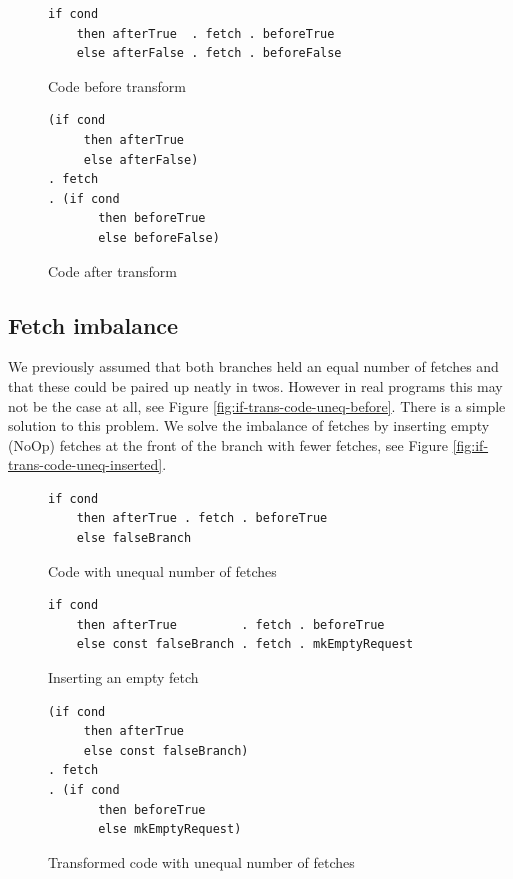 \begin{figure}
\begin{verbatim}
if cond
    then afterTrue  . fetch . beforeTrue
    else afterFalse . fetch . beforeFalse
\end{verbatim}
\caption{Code before transform}
\label{fig:if-trans-code-before}
\begin{verbatim}
(if cond
     then afterTrue
     else afterFalse)
. fetch
. (if cond
       then beforeTrue
       else beforeFalse)
\end{verbatim}
\caption{Code after transform}
\label{fig:if-trans-code-after}
\end{figure}

\subsection{Fetch imbalance}

We previously assumed that both branches held an equal number of fetches and that these could be paired up neatly in twos.
However in real programs this may not be the case at all, see Figure \ref{fig:if-trans-code-uneq-before}.
There is a simple solution to this problem.
We solve the imbalance of fetches by inserting empty (NoOp) fetches at the front of the branch with fewer fetches, see Figure \ref{fig:if-trans-code-uneq-inserted}.

\begin{figure}
\begin{verbatim}
if cond
    then afterTrue . fetch . beforeTrue
    else falseBranch
\end{verbatim}
\caption{Code with unequal number of fetches}
\label{fig:if-trans-code-uneq-before}
\begin{verbatim}
if cond
    then afterTrue         . fetch . beforeTrue
    else const falseBranch . fetch . mkEmptyRequest
\end{verbatim}
\caption{Inserting an empty fetch}
\label{fig:if-trans-code-uneq-inserted}
\begin{verbatim}
(if cond
     then afterTrue
     else const falseBranch)
. fetch
. (if cond
       then beforeTrue
       else mkEmptyRequest)
\end{verbatim}
\caption{Transformed code with unequal number of fetches}
\label{fig:if-trans-code-uneq-after}
\end{figure}

